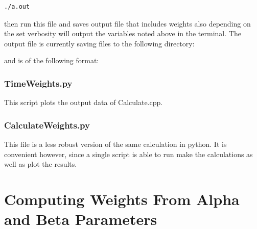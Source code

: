 \documentclass{article}
\begin{document}
 \begin{verbatim}    
./a.out 
\end{verbatim}
      
     
      then run this file and saves output file that includes weights also depending on the set verbosity will output the variables noted above in the terminal. The output file is currently saving files to the following directory: 
      
      and is of the following format: 

          \subsubsection{TimeWeights.py}     
          
          This script plots the output data of Calculate.cpp. 
     \subsubsection{CalculateWeights.py}
     
This file is a less robust version of the same calculation in python. It is convenient however, since a single script is able to run make the calculations as well as plot the results. 



\section{Computing Weights From Alpha and Beta Parameters} 
\end{document}
